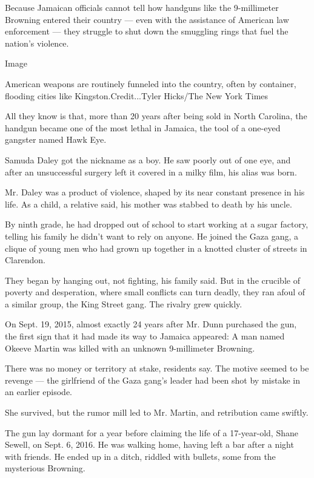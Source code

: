Because Jamaican officials cannot tell how handguns like the
9-millimeter Browning entered their country --- even with the assistance
of American law enforcement --- they struggle to shut down the smuggling
rings that fuel the nation's violence.

Image

American weapons are routinely funneled into the country, often by
container, flooding cities like Kingston.Credit...Tyler Hicks/The New
York Times

All they know is that, more than 20 years after being sold in North
Carolina, the handgun became one of the most lethal in Jamaica, the tool
of a one-eyed gangster named Hawk Eye.

Samuda Daley got the nickname as a boy. He saw poorly out of one eye,
and after an unsuccessful surgery left it covered in a milky film, his
alias was born.

Mr. Daley was a product of violence, shaped by its near constant
presence in his life. As a child, a relative said, his mother was
stabbed to death by his uncle.

By ninth grade, he had dropped out of school to start working at a sugar
factory, telling his family he didn't want to rely on anyone. He joined
the Gaza gang, a clique of young men who had grown up together in a
knotted cluster of streets in Clarendon.

They began by hanging out, not fighting, his family said. But in the
crucible of poverty and desperation, where small conflicts can turn
deadly, they ran afoul of a similar group, the King Street gang. The
rivalry grew quickly.

On Sept. 19, 2015, almost exactly 24 years after Mr. Dunn purchased the
gun, the first sign that it had made its way to Jamaica appeared: A man
named Okeeve Martin was killed with an unknown 9-millimeter Browning.

There was no money or territory at stake, residents say. The motive
seemed to be revenge --- the girlfriend of the Gaza gang's leader had
been shot by mistake in an earlier episode.

She survived, but the rumor mill led to Mr. Martin, and retribution came
swiftly.

The gun lay dormant for a year before claiming the life of a
17-year-old, Shane Sewell, on Sept. 6, 2016. He was walking home, having
left a bar after a night with friends. He ended up in a ditch, riddled
with bullets, some from the mysterious Browning.

